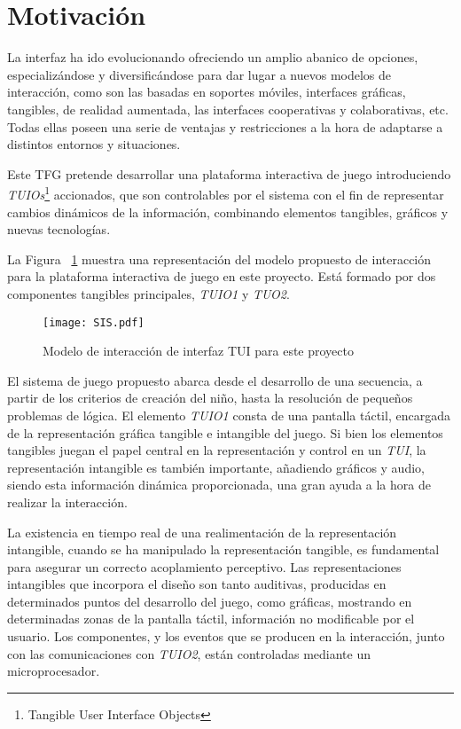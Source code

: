 \section{Motivación}

La interfaz ha ido evolucionando ofreciendo un amplio abanico de opciones, especializándose y diversificándose para dar lugar a nuevos modelos de interacción, como son las basadas en soportes móviles, interfaces gráficas, tangibles, de realidad aumentada, las interfaces cooperativas y colaborativas, etc. Todas ellas poseen una serie de ventajas y restricciones a la hora de adaptarse a distintos entornos y situaciones.

Este TFG pretende desarrollar una plataforma interactiva de juego introduciendo \emph{TUIOs}\footnote{Tangible User Interface Objects} accionados, que son controlables por el sistema con el fin de representar cambios dinámicos de la información, combinando elementos tangibles, gráficos y nuevas tecnologías.

La Figura ~\ref{fig:SIS} muestra una representación del modelo propuesto de interacción para la plataforma interactiva de juego en este proyecto. Está formado por dos componentes tangibles principales, \emph{TUIO1} y \emph{TUO2}.

\begin{figure}[!h]
\begin{center}
\texttt{[image: SIS.pdf]}
\caption{Modelo de interacción de interfaz TUI para este proyecto}
\label{fig:SIS}
\end{center}
\end{figure}

El sistema de juego propuesto abarca desde el desarrollo de una secuencia, a partir de los criterios de creación del niño, hasta la resolución de pequeños problemas de lógica. El elemento \emph{TUIO1} consta de una pantalla táctil, encargada de la representación gráfica tangible e intangible del juego. Si bien los elementos tangibles juegan el papel central en la representación y control en un \emph{TUI}, la representación intangible es también importante, añadiendo gráficos y audio, siendo esta información dinámica proporcionada, una gran ayuda a la hora de realizar la interacción. 

La existencia en tiempo real de una realimentación de la representación intangible, cuando se ha manipulado la representación tangible, es fundamental para asegurar un correcto acoplamiento perceptivo. Las representaciones intangibles que incorpora el diseño son tanto auditivas, producidas en determinados puntos del desarrollo del juego, como gráficas, mostrando en determinadas zonas de la pantalla táctil, información no modificable por el usuario.
Los componentes, y los eventos que se producen en la interacción, junto con las comunicaciones con \emph{TUIO2}, están controladas mediante un microprocesador.

